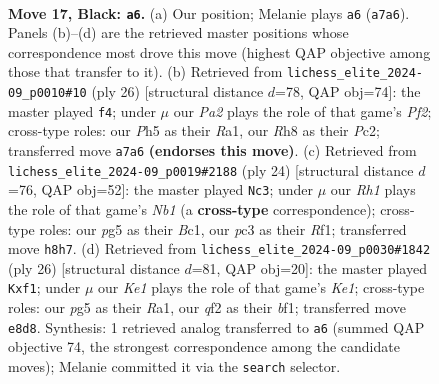 \documentclass[11pt]{article}
\begin{document}
\clearpage

\begin{figure}[p]\centering
\begin{subfigure}{0.46\textwidth}\centering
\resizebox{\linewidth}{!}{%
\newchessgame
\chessboard[
  setfen={2r1kbnr/pb3pp1/1q1P4/2p3Pp/2p2P1P/2P4R/PP3Q2/RNB1K2B b Qk - 0 17},
  showmover=false,
  pgfstyle=straightmove, color=movearrow, markmove={a7-a6}
]}
\caption{}
\end{subfigure}\hfill
\begin{subfigure}{0.46\textwidth}\centering
\resizebox{\linewidth}{!}{%
\newchessgame
\chessboard[
  setfen={r1bqk2r/pp3p2/2n1p2p/2ppP1pP/3P2Q1/8/P1P1BPP1/R1B1K2R w KQkq - 0 14},
  showmover=false,
  pgfstyle=straightmove, color=movearrow, markmove={f2-f4}
]}
\caption{}
\end{subfigure}
\\[4pt]
\begin{subfigure}{0.46\textwidth}\centering
\resizebox{\linewidth}{!}{%
\newchessgame
\chessboard[
  setfen={1r2kbnr/2pq1pp1/p2p4/1p2p1N1/2P1P1p1/1P6/1P3PP1/RNBQ1RK1 w k - 1 13},
  showmover=false,
  pgfstyle=straightmove, color=movearrow, markmove={b1-c3}
]}
\caption{}
\end{subfigure}\hfill
\begin{subfigure}{0.46\textwidth}\centering
\resizebox{\linewidth}{!}{%
\newchessgame
\chessboard[
  setfen={rn3r1k/p1pq1ppp/1p2p3/3pP3/P2P2QB/2P5/2P2PPP/R3Kb1R w KQ - 0 14},
  showmover=false,
  pgfstyle=straightmove, color=movearrow, markmove={e1-f1}
]}
\caption{}
\end{subfigure}
\caption{\textbf{Move 17, Black: \texttt{a6}.} (a) Our position; Melanie plays \texttt{a6} (\texttt{a7a6}). Panels (b)--(d) are the retrieved master positions whose correspondence most drove this move (highest QAP objective among those that transfer to it). (b) Retrieved from \texttt{lichess\_elite\_2024-09\_p0010\#10} (ply 26) [structural distance $d$=78, QAP obj=74]: the master played \texttt{f4}; under $\mu$ our \emph{Pa2} plays the role of that game's \emph{Pf2}; cross-type roles: our \emph{P}h5 as their \emph{R}a1, our \emph{R}h8 as their \emph{P}c2; transferred move \texttt{a7a6} \textbf{(endorses this move)}. (c) Retrieved from \texttt{lichess\_elite\_2024-09\_p0019\#2188} (ply 24) [structural distance $d$=76, QAP obj=52]: the master played \texttt{Nc3}; under $\mu$ our \emph{Rh1} plays the role of that game's \emph{Nb1} (a \textbf{cross-type} correspondence); cross-type roles: our \emph{p}g5 as their \emph{B}c1, our \emph{p}c3 as their \emph{R}f1; transferred move \texttt{h8h7}. (d) Retrieved from \texttt{lichess\_elite\_2024-09\_p0030\#1842} (ply 26) [structural distance $d$=81, QAP obj=20]: the master played \texttt{Kxf1}; under $\mu$ our \emph{Ke1} plays the role of that game's \emph{Ke1}; cross-type roles: our \emph{p}g5 as their \emph{R}a1, our \emph{q}f2 as their \emph{b}f1; transferred move \texttt{e8d8}. Synthesis: 1 retrieved analog transferred to \texttt{a6} (summed QAP objective 74, the strongest correspondence among the candidate moves); Melanie committed it via the \texttt{search} selector.}
\label{fig:thought-m33}
\end{figure}
\end{document}
